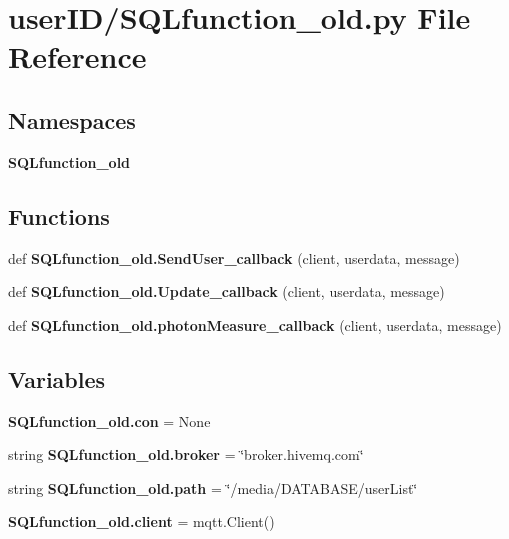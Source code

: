 \section{user\+I\+D/\+S\+Q\+Lfunction\+\_\+old.py File Reference}
\label{_s_q_lfunction__old_8py}
\subsection*{Namespaces}
\begin{DoxyCompactItemize}
\item 
 \textbf{ S\+Q\+Lfunction\+\_\+old}
\end{DoxyCompactItemize}
\subsection*{Functions}
\begin{DoxyCompactItemize}
\item 
def \textbf{ S\+Q\+Lfunction\+\_\+old.\+Send\+User\+\_\+callback} (client, userdata, message)
\item 
def \textbf{ S\+Q\+Lfunction\+\_\+old.\+Update\+\_\+callback} (client, userdata, message)
\item 
def \textbf{ S\+Q\+Lfunction\+\_\+old.\+photon\+Measure\+\_\+callback} (client, userdata, message)
\end{DoxyCompactItemize}
\subsection*{Variables}
\begin{DoxyCompactItemize}
\item 
\textbf{ S\+Q\+Lfunction\+\_\+old.\+con} = None
\item 
string \textbf{ S\+Q\+Lfunction\+\_\+old.\+broker} = \char`\"{}broker.\+hivemq.\+com\char`\"{}
\item 
string \textbf{ S\+Q\+Lfunction\+\_\+old.\+path} = \char`\"{}/media/D\+A\+T\+A\+B\+A\+SE/user\+List\char`\"{}
\item 
\textbf{ S\+Q\+Lfunction\+\_\+old.\+client} = mqtt.\+Client()
\end{DoxyCompactItemize}
